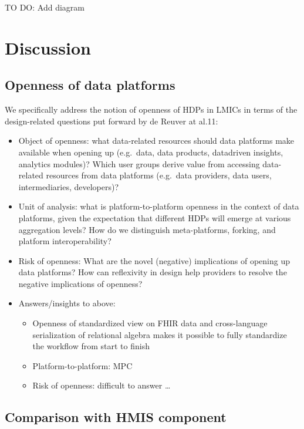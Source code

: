 \documentclass[
  authoryear]{elsarticle}
\providecommand{\tightlist}{%
  \setlength{\itemsep}{0pt}\setlength{\parskip}{0pt}}\usepackage{longtable,booktabs,array}
\begin{document}
TO DO: Add diagram

\section{Discussion}\label{discussion}

\subsection{Openness of data
platforms}\label{openness-of-data-platforms}

We specifically address the notion of openness of HDPs in LMICs in terms
of the design-related questions put forward by de Reuver at al.11:

\begin{itemize}
\item
  Object of openness: what data-related resources should data platforms
  make available when opening up (e.g.~data, data products, datadriven
  insights, analytics modules)? Which user groups derive value from
  accessing data-related resources from data platforms (e.g.~data
  providers, data users, intermediaries, developers)?
\item
  Unit of analysis: what is platform-to-platform openness in the context
  of data platforms, given the expectation that different HDPs will
  emerge at various aggregation levels? How do we distinguish
  meta-platforms, forking, and platform interoperability?
\item
  Risk of openness: What are the novel (negative) implications of
  opening up data platforms? How can reflexivity in design help
  providers to resolve the negative implications of openness?
\item
  Answers/insights to above:

  \begin{itemize}
  \tightlist
  \item
    Openness of standardized view on FHIR data and cross-language
    serialization of relational algebra makes it possible to fully
    standardize the workflow from start to finish
  \item
    Platform-to-platform: MPC
  \item
    Risk of openness: difficult to answer \ldots{}
  \end{itemize}
\end{itemize}

\subsection{Comparison with HMIS
component}\label{comparison-with-hmis-component}
\end{document}
